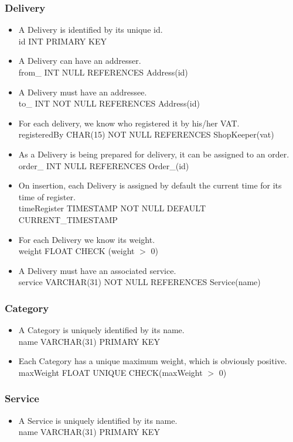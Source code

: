 \documentclass{report}[a4paper]
\theoremstyle{remark}
\begin{document}
\subsubsection{Delivery}
\begin{itemize}
    \item A Delivery is identified by its unique id. \\id INT PRIMARY KEY
    \item A Delivery can have an addresser. \\ from\_ INT NULL REFERENCES Address(id)
    \item A Delivery must have an addressee. \\ to\_ INT NOT NULL REFERENCES Address(id)
    \item For each delivery, we know who registered it by his/her VAT. \\ registeredBy CHAR(15) NOT NULL REFERENCES ShopKeeper(vat)
    \item As a Delivery is being prepared for delivery, it can be assigned to an order. \\ order\_ INT NULL REFERENCES Order\_(id)
    \item On insertion, each Delivery is assigned by default the current time for its time of register. \\ timeRegister TIMESTAMP NOT NULL DEFAULT CURRENT\_TIMESTAMP
    \item For each Delivery we know its weight. \\ weight FLOAT CHECK (weight $>$ 0)
    \item A Delivery must have an associated service. \\ service VARCHAR(31) NOT NULL REFERENCES Service(name)
\end{itemize}
\subsubsection{Category}
\begin{itemize}
    \item A Category is uniquely identified by its name. \\ name VARCHAR(31) PRIMARY KEY
    \item Each Category has a unique maximum weight, which is obviously positive. \\ maxWeight FLOAT UNIQUE CHECK(maxWeight $>$ 0)
\end{itemize}
\subsubsection{Service}
\begin{itemize}
    \item A Service is uniquely identified by its name. \\ name VARCHAR(31) PRIMARY KEY
\end{itemize}
\end{document}
